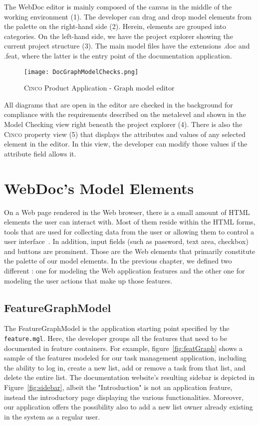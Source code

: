 The WebDoc editor is mainly composed of the canvas in the middle of the working environment (1). The developer can drag and drop model elements from the palette on the right-hand side (2). Herein, elements are grouped into categories. On the left-hand side, we have the project explorer showing the current project structure (3). The main model files have the extensions .doc and .feat, where the latter is the entry point of the documentation application.

\begin{figure}[h]
    \centering
    \texttt{[image: DocGraphModelChecks.png]}
    \caption{\textsc{Cinco} Product Application - Graph model editor}\label{fig:graphDSL}
\end{figure}

All diagrams that are open in the editor are checked in the background for compliance with the requirements described on the metalevel and shown in the Model Checking view right beneath the project explorer (4). There is also the \textsc{Cinco} property view (5) that displays the attributes and values of any selected element in the editor. In this view, the developer can modify those values if the attribute field allows it.

\section{WebDoc's Model Elements}\label{sec:WebDocModelElem}

On a Web page rendered in the Web browser, there is a small amount of HTML elements the user can interact with. Most of them reside within the HTML forms, tools that are used for collecting data from the user or allowing them to control a user interface~\cite{mozillaMDN}. In addition, input fields (such as password, text area, checkbox) and buttons are prominent. Those are the Web elements that primarily constitute the palette of our model elements. In the previous chapter, we defined two different : one for modeling the Web application features and the other one for modeling the user actions that make up those features.

\subsection{FeatureGraphModel}\label{sec:FeaGrahptModElem}

The FeatureGraphModel is the application starting point specified by the \lstinline{feature.mgl}. Here, the developer groups all the features that need to be documented in feature containers. For example, figure~\ref{fig:featGraph} shows a sample of the features modeled for our task management application, including the ability to log in, create a new list, add or remove a task from that list, and delete the entire list. The documentation website's resulting sidebar is depicted in Figure~\ref{fig:sidebar}, albeit the "Introduction" is not an application feature, instead the introductory page displaying the various functionalities. Moreover, our application offers the possibility also to add a new list owner already existing in the system as a regular user.

